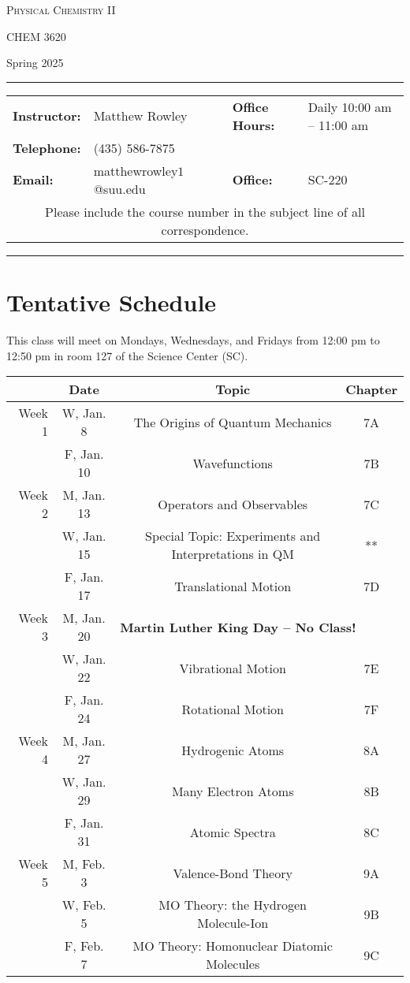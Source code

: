 \documentclass[12pt, letterpaper]{article}
\begin{document}
\begin{center}
	{\Large \textsc{Physical Chemistry II}}

	CHEM 3620
\end{center}

\begin{center}
	{\large Spring 2025}
\end{center}
\begin{center}
	\rule{0.99\textwidth}{0.4pt}
	\begin{tabular}{llcll}
		\textbf{Instructor:} & Matthew Rowley           &  & \textbf{Office Hours:} & Daily 10:00 am -- 11:00 am \\
		\textbf{Telephone:}  & (435) 586-7875           &  &                        &                            \\
		\textbf{Email:}      & matthewrowley$1$@suu.edu &  & \textbf{Office:}       & SC-220                     \\
		\multicolumn{5}{c}{Please include the course number in the subject line of all correspondence.}
	\end{tabular}
	\rule{0.99\textwidth}{0.4pt}
\end{center}

\section*{Tentative Schedule}
This class will meet on Mondays, Wednesdays, and Fridays from 12:00 pm to 12:50 pm in room 127 of the Science Center (SC).

\begin{tabular}{rcccc}
& Date && Topic & Chapter\\
\midrule
Week 1 & W, Jan. 8&& The Origins of Quantum Mechanics & 7A\\
& F, Jan. 10&& Wavefunctions & 7B\\
\midrule
Week 2 & M, Jan. 13&& Operators and Observables & 7C\\
& W, Jan. 15&& Special Topic: Experiments and Interpretations in QM & **\\
& F, Jan. 17&& Translational Motion & 7D\\
\midrule
Week 3 & M, Jan. 20& \multicolumn{3}{l}{\textbf{Martin Luther King Day -- No Class!}}\\
& W, Jan. 22&& Vibrational Motion & 7E\\
& F, Jan. 24&& Rotational Motion & 7F\\
\midrule
Week 4 & M, Jan. 27&& Hydrogenic Atoms & 8A\\
& W, Jan. 29&& Many Electron Atoms & 8B\\
& F, Jan. 31&& Atomic Spectra & 8C\\
\midrule
Week 5 & M, Feb. 3&& Valence-Bond Theory & 9A\\
& W, Feb. 5&& MO Theory: the Hydrogen Molecule-Ion & 9B\\
& F, Feb. 7&& MO Theory: Homonuclear Diatomic Molecules & 9C\\
\end{tabular}
\end{document}
